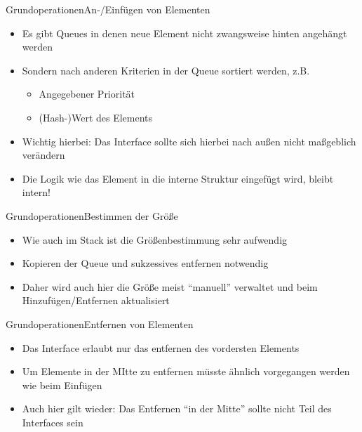 \begin{frame}{Grundoperationen}{An-/Einfügen von Elementen}
	\begin{itemize}
		\item Es gibt Queues in denen neue Element nicht zwangsweise hinten angehängt werden
		\item Sondern nach anderen Kriterien in der Queue sortiert werden, z.B.
		\begin{itemize}
			\item Angegebener Priorität
			\item (Hash-)Wert des Elements
		\end{itemize}
		\item Wichtig hierbei: Das Interface sollte sich hierbei nach außen nicht maßgeblich verändern
		\item Die Logik wie das Element in die interne Struktur eingefügt wird, bleibt intern!
	\end{itemize}
\end{frame}

\begin{frame}{Grundoperationen}{Bestimmen der Größe}
	\begin{itemize}
		\item Wie auch im Stack ist die Größenbestimmung sehr aufwendig
		\item Kopieren der Queue und sukzessives entfernen notwendig
		\item Daher wird auch hier die Größe meist "`manuell"' verwaltet und beim Hinzufügen/Entfernen aktualisiert
	\end{itemize}
\end{frame}

\begin{frame}{Grundoperationen}{Entfernen von Elementen}
	\begin{itemize}
		\item Das Interface erlaubt nur das entfernen des vordersten Elements
		\item Um Elemente in der MItte zu entfernen müsste ähnlich vorgegangen werden wie beim Einfügen
		\item Auch hier gilt wieder: Das Entfernen "`in der Mitte"' sollte nicht Teil des Interfaces sein
	\end{itemize}
\end{frame}

